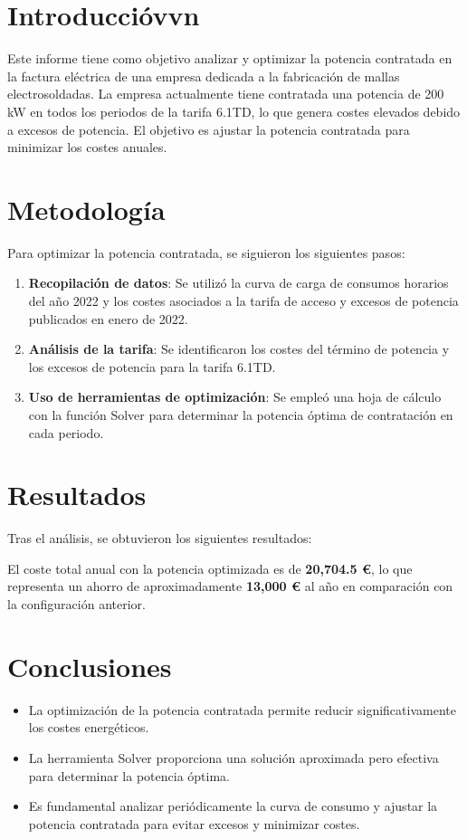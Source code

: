 \documentclass[a4paper,10pt,twocolumn]{article}
\begin{document}
\begin{Form}
\section{Introduccióvvn}
Este informe tiene como objetivo analizar y optimizar la potencia contratada en la factura eléctrica de una empresa dedicada a la fabricación de mallas electrosoldadas. La empresa actualmente tiene contratada una potencia de 200 kW en todos los periodos de la tarifa 6.1TD, lo que genera costes elevados debido a excesos de potencia. El objetivo es ajustar la potencia contratada para minimizar los costes anuales.

\section{Metodología}
Para optimizar la potencia contratada, se siguieron los siguientes pasos:

\begin{enumerate}
    \item \textbf{Recopilación de datos}: Se utilizó la curva de carga de consumos horarios del año 2022 y los costes asociados a la tarifa de acceso y excesos de potencia publicados en enero de 2022.
    \item \textbf{Análisis de la tarifa}: Se identificaron los costes del término de potencia y los excesos de potencia para la tarifa 6.1TD.
    \item \textbf{Uso de herramientas de optimización}: Se empleó una hoja de cálculo con la función Solver para determinar la potencia óptima de contratación en cada periodo.
\end{enumerate}

\section{Resultados}
Tras el análisis, se obtuvieron los siguientes resultados:



El coste total anual con la potencia optimizada es de \textbf{20,704.5 €}, lo que representa un ahorro de aproximadamente \textbf{13,000 €} al año en comparación con la configuración anterior.

\section{Conclusiones}
\begin{itemize}
    \item La optimización de la potencia contratada permite reducir significativamente los costes energéticos.
    \item La herramienta Solver proporciona una solución aproximada pero efectiva para determinar la potencia óptima.
    \item Es fundamental analizar periódicamente la curva de consumo y ajustar la potencia contratada para evitar excesos y minimizar costes.
\end{itemize}


\end{Form}
\end{document}
